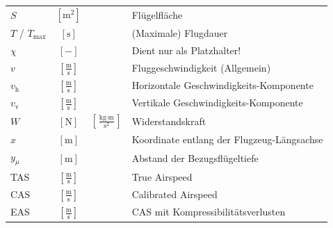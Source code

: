 \begin{raggedright}
\begin{table}[H]
{\begin{tabular}{l c c l}
        $S$             & $\left[\text{m}^2\right]$ & & Flügelfläche \\[1.4ex]
        $T$ / $T_\text{max}$ & $\left[\text{s}\right]$ & & (Maximale) Flugdauer \\[1.4ex]
        $\chi$          & $\left[-\right]$ & & Dient nur als Platzhalter! \\[1.4ex]
        $v$             & $\left[\frac{\text{m}}{\text{s}}\right]$ & & Fluggeschwindigkeit (Allgemein) \\[1.4ex]
        $v_\text{h}$    & $\left[\frac{\text{m}}{\text{s}}\right]$ & & Horizontale Geschwindigkeits-Komponente \\[1.4ex]
        $v_\text{v}$    & $\left[\frac{\text{m}}{\text{s}}\right]$ & & Vertikale Geschwindigkeits-Komponente \\[1.4ex]
        $W$             & $\left[\text{N}\right]$ & $\left[\frac{\text{kg}\cdot\text{m}}{\text{s}^2}\right]$ & Widerstandskraft \\[2.0ex]
        $x$             & $\left[\text{m}\right]$ & & Koordinate entlang der Flugzeug-Längsachse \\[1.4ex]
        $y_\mu$         & $\left[\text{m}\right]$ & & Abstand der Bezugsflügeltiefe \\[5.0ex]
        TAS             & $\left[\frac{\text{m}}{\text{s}}\right]$ & & True Airspeed \\[1.4ex]
        CAS             & $\left[\frac{\text{m}}{\text{s}}\right]$ & & Calibrated Airspeed \\[1.4ex]
        EAS             & $\left[\frac{\text{m}}{\text{s}}\right]$ & & CAS mit Kompressibilitätsverlusten \\[1.4ex]
    \end{tabular}
    }
\end{table}

\end{raggedright}

\restoregeometry